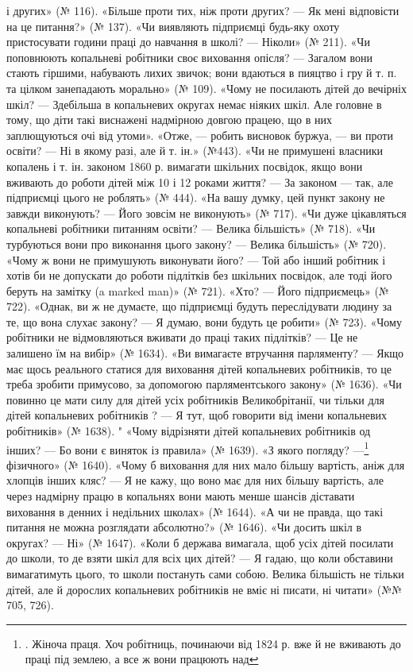 і других» (№ 116). «Більше проти тих, ніж проти других? — Як
мені відповісти на це питання?» (№ 137). «Чи виявляють підприємці
будь-яку охоту пристосувати години праці до навчання
в школі? — Ніколи» (№ 211). «Чи поповнюють копальневі
робітники своє виховання опісля? — Загалом вони стають гіршими,
набувають лихих звичок; вони вдаються в пияцтво і гру
й т. п. та цілком занепадають морально» (№ 109). «Чому не посилають
дітей до вечірніх шкіл? — Здебільша в копальневих округах
немає ніяких шкіл. Але головне в тому, що діти такі виснажені
надмірною довгою працею, що в них заплющуються очі від утоми».
«Отже, — робить висновок буржуа, — ви проти освіти? — Ні в
якому разі, але й т. ін.» (№443). «Чи не примушені власники
копалень і т. ін. законом 1860 р. вимагати шкільних посвідок,
якщо вони вживають до роботи дітей між 10 і 12 роками життя? —
За законом — так, але підприємці цього не роблять» (№ 444).
«На вашу думку, цей пункт закону не завжди виконують? —
Його зовсім не виконують» (№ 717). «Чи дуже цікавляться копальневі
робітники питанням освіти? — Велика більшість» (№ 718).
«Чи турбуються вони про виконання цього закону? — Велика
більшість» (№ 720). «Чому ж вони не примушують виконувати
його? — Той або інший робітник і хотів би не допускати до роботи
підлітків без шкільних посвідок, але тоді його беруть на замітку
(a marked man)» (№ 721). «Хто? — Його підприємець» (№ 722).
«Однак, ви ж не думаєте, що підприємці будуть переслідувати
людину за те, що вона слухає закону? — Я думаю, вони будуть
це робити» (№ 723). «Чому робітники не відмовляються вживати
до праці таких підлітків? — Це не залишено їм на вибір» (№ 1634).
«Ви вимагаєте втручання парляменту? — Якщо має щось реального
статися для виховання дітей копальневих робітників, то
це треба зробити примусово, за допомогою парляментського закону»
(№ 1636). «Чи повинно це мати силу для дітей усіх робітників
Великобрітанії, чи тільки для дітей копальневих робітників
? — Я тут, щоб говорити від імени копальневих робітників»
(№ 1638). " «Чому відрізняти дітей копальневих робітників од
інших? — Бо вони є виняток із правила» (№ 1639). «З якого
погляду? —\footnote{
. Жіноча праця. Хоч робітниць, починаючи від 1824 р. вже
й не вживають до праці під землею, а все ж вони працюють над
} фізичного» (№ 1640). «Чому б виховання для них
мало більшу вартість, аніж для хлопців інших кляс? — Я не
кажу, що воно має для них більшу вартість, але через надмірну
працю в копальнях вони мають менше шансів діставати виховання
в денних і недільних школах» (№ 1644). «А чи не правда,
що такі питання не можна розглядати абсолютно?» (№ 1646).
«Чи досить шкіл в округах? — Ні» (№ 1647). «Коли б держава
вимагала, щоб усіх дітей посилати до школи, то де взяти шкіл
для всіх цих дітей? — Я гадаю, що коли обставини вимагатимуть
цього, то школи постануть сами собою. Велика більшість
не тільки дітей, але й дорослих копальневих робітників не вміє
ні писати, ні читати» (№№ 705, 726).